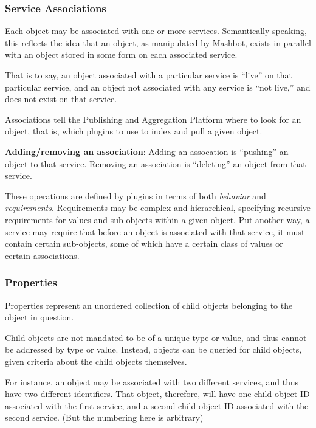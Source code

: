 \documentclass{report}
\begin{document}
		\subsubsection{Service Associations}
			Each object may be associated with one or more services.
			Semantically speaking, this reflects the idea that an object, as 
			manipulated by Mashbot, exists in parallel with an object stored in 
			some form on each associated service.

			That is to say, an object associated with a particular service is 
			``live'' on that particular service, and an object not associated 
			with any service is ``not live,'' and does not exist on that 
			service.

			Associations tell the Publishing and Aggregation Platform where to 
			look for an object, that is, which plugins to use to index and pull 
			a given object.

			\textbf{Adding/removing an association}:
			Adding an assocation is ``pushing'' an object to that service.  
			Removing an association is ``deleting'' an object from that
			service.  
			
			These operations are defined by plugins in terms of both
			\emph{behavior} and \emph{requirements}. Requirements may be
			complex and hierarchical, specifying recursive requirements for 
			values and sub-objects within a given object. Put another way,
			a service may require that before an object is associated with 
			that service, it must contain certain sub-objects, some of which
			have a certain class of values or certain associations.
			
		\subsubsection{Properties}
			Properties represent an unordered collection of child objects 
			belonging to the object in question.

			Child objects are not mandated to be of a unique type or value, and 
			thus cannot be addressed by type or value. Instead, objects can be 
			queried for child objects, given criteria about the child objects 
			themselves.

			For instance, an object may be associated with two different 
			services, and thus have two different identifiers. That object, 
			therefore, will have one child object ID associated with the first 
			service, and a second child object ID associated with the second 
service. (But the numbering here is arbitrary)
\end{document}
